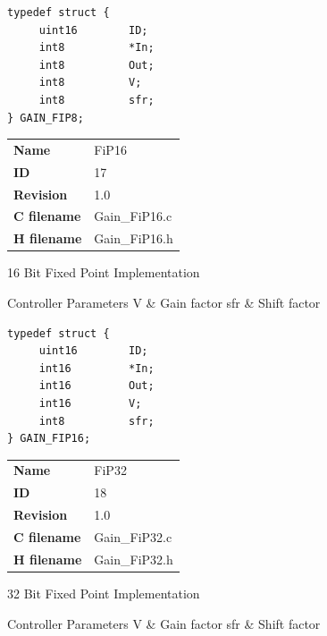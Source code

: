 \begin{lstlisting}
typedef struct {
     uint16        ID;
     int8          *In;
     int8          Out;
     int8          V;
     int8          sfr;
} GAIN_FIP8;
\end{lstlisting}

\ifdefined \AddTestReports
{}
\fi
{}
\nopagebreak[0]
\begin{tabular}{l l}
\textbf{Name} & FiP16 \tabularnewline
\textbf{ID} & 17 \tabularnewline
\textbf{Revision} & 1.0 \tabularnewline
\textbf{C filename} & Gain\_FiP16.c \tabularnewline
\textbf{H filename} & Gain\_FiP16.h \tabularnewline
\end{tabular}
\vspace{1ex}

16 Bit Fixed Point Implementation

\begin{XtoCtabular}{Controller Parameters}
V & Gain factor\tabularnewline
\hline
sfr & Shift factor\tabularnewline
\hline
\end{XtoCtabular}

\begin{lstlisting}
typedef struct {
     uint16        ID;
     int16         *In;
     int16         Out;
     int16         V;
     int8          sfr;
} GAIN_FIP16;
\end{lstlisting}

\ifdefined \AddTestReports
{}
\fi
{}
\nopagebreak[0]
\begin{tabular}{l l}
\textbf{Name} & FiP32 \tabularnewline
\textbf{ID} & 18 \tabularnewline
\textbf{Revision} & 1.0 \tabularnewline
\textbf{C filename} & Gain\_FiP32.c \tabularnewline
\textbf{H filename} & Gain\_FiP32.h \tabularnewline
\end{tabular}
\vspace{1ex}

32 Bit Fixed Point Implementation

\begin{XtoCtabular}{Controller Parameters}
V & Gain factor\tabularnewline
\hline
sfr & Shift factor\tabularnewline
\hline
\end{XtoCtabular}

